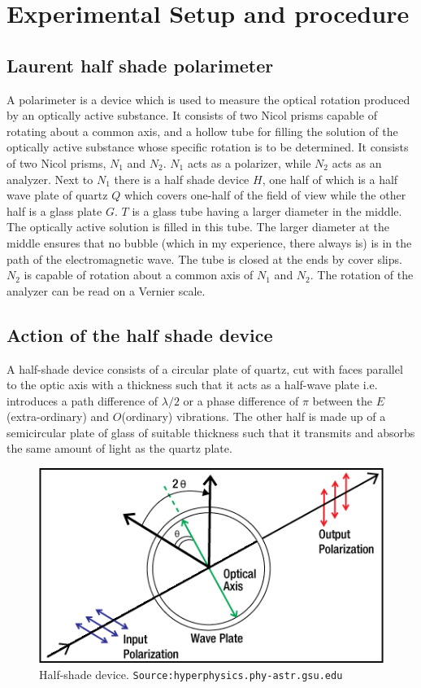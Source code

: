 \documentclass{dkpinto-report}
\begin{document}
\section{Experimental Setup and procedure}

\subsection{Laurent half shade polarimeter}
A polarimeter is a device which is used to measure the optical rotation produced by an optically active substance. It consists of two Nicol prisms capable of rotating about a common axis, and a hollow tube for filling the solution of the optically active substance whose specific rotation is to be determined. It consists of two Nicol prisms, $N_1$ and $N_2$. $N_1$ acts as a polarizer, while $N_2$ acts as an analyzer. Next to $N_1$ there is a half shade device $H$, one half of which is a half wave plate of quartz $Q$ which covers one-half of the field of view while the other half is a glass plate $G$. $T$ is a glass tube having a larger diameter in the middle. The optically active solution is filled in this tube. The larger diameter at the middle ensures that no bubble (which in my experience, there always is) is in the path of the electromagnetic wave. The tube is closed at the ends by cover slips. $N_2$ is capable of rotation about a common axis of $N_1$ and $N_2$. The rotation of the analyzer can be read on a Vernier scale.   

\subsection{Action of the half shade device}
A half-shade device consists of a circular plate of quartz, cut with faces parallel to the optic axis with a thickness such that it acts as a half-wave plate i.e. introduces a path difference of $\lambda / 2$ or a phase difference of $\pi$ between the $E$(extra-ordinary) and $O$(ordinary) vibrations. The other half is made up of a semicircular plate of glass of suitable thickness such that it transmits and absorbs the same amount of light as the quartz plate.

\begin{figure}
\centering
\caption{Half-shade device. \texttt{Source:hyperphysics.phy-astr.gsu.edu}}
\includegraphics[scale=0.4]{Images/half_plate.png}
\end{figure}
\end{document}
